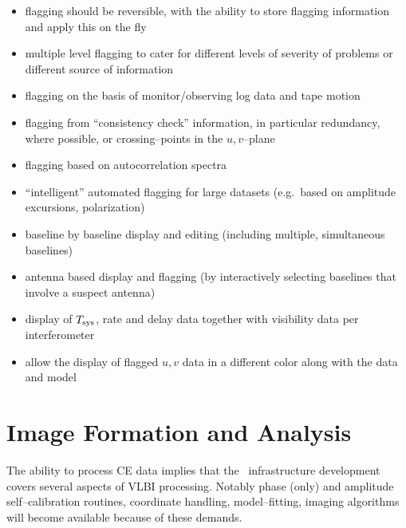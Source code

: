 \begin{itemize}

\item flagging should be reversible, with the ability to store
  flagging information and apply this on the fly
  
\item multiple level flagging to cater for different levels of
  severity of problems or different source of information
  
\item flagging on the basis of monitor\slash observing log data and
  tape motion
  
\item flagging from ``consistency check'' information, in particular
  redundancy, where possible, or crossing--points in the $u,\! v$--plane

\item flagging based on autocorrelation spectra
  
\item ``intelligent'' automated flagging for large datasets (e.g.\ 
  based on amplitude excursions, polarization)

\item baseline by baseline display and editing (including multiple,
  simultaneous baselines)

\item antenna based display and flagging (by interactively selecting
  baselines that involve a suspect antenna)

\item display of $T_{\rm sys}$, rate and delay data together with visibility
  data per interferometer
  
\item allow the display of flagged $u,\! v$ data in a different color
  along with the data and model

\end{itemize}
  

\section{Image Formation and Analysis}

The ability to process CE data implies that the \aipspp\ 
infrastructure development covers several aspects of VLBI processing.
Notably phase (only) and amplitude self--calibration routines,
coordinate handling, model--fitting, imaging algorithms will
become available because of these demands.

